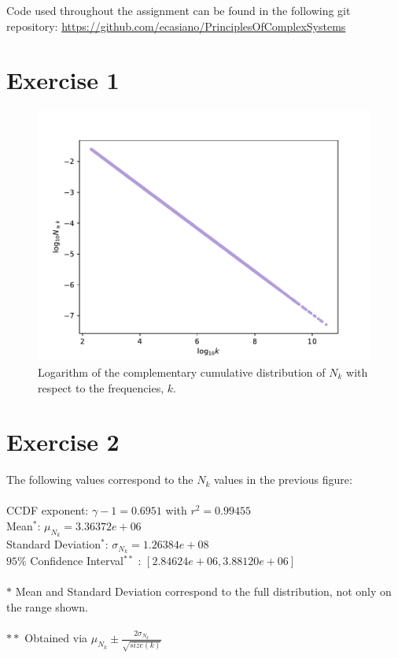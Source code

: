 \documentclass{article}
\begin{document}
Code used throughout the assignment can be found in the following git repository: \url{https://github.com/ecasiano/PrinciplesOfComplexSystems} \\

\section{Exercise 1}

\begin{figure}[h!]
\includegraphics[width=\linewidth]{Q01/wordFrequencyCCDFLog.pdf}
\caption{Logarithm of the complementary cumulative distribution of $N_k$ with respect to the frequencies, $k$. }
\label{fig:ccdf}
\end{figure}

\section{Exercise 2}

The following values correspond to the $N_k$ values in the previous figure: \\
\\
CCDF exponent: $\gamma-1 = 0.6951$ with $r^2 = 0.99455$\\
Mean$^*$: $\mu_{N_k} = 3.36372e+06$\\
Standard Deviation$^*$: $\sigma_{N_k} =1.26384e+08$\\
$95\%$ Confidence Interval$^{**}$ : $[2.84624e+06,3.88120e+06]$\\
\\
$*$ Mean and Standard Deviation correspond to the full distribution, not only on the range shown.\\
\\
$**$ Obtained via $\mu_{N_k} \pm \frac{2\sigma_{N_k}}{\sqrt{size(k)}}$ 
\end{document}
